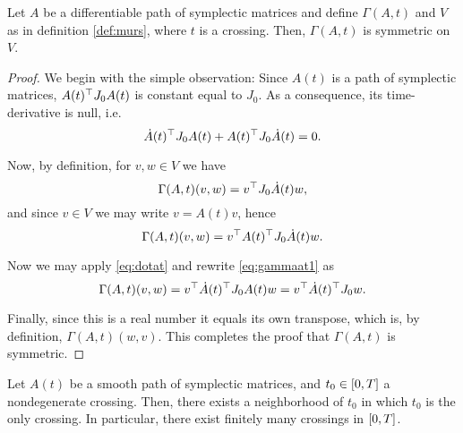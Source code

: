 \begin{lemma}\label{lemma:rs1}
Let $A$ be a differentiable path of symplectic matrices and define $\Gamma(A,t)$ and $V$ as in definition \ref{def:murs}, where $t$ is a crossing. Then, $\Gamma(A,t)$ is symmetric on $V$.
\end{lemma}

\begin{proof}
We begin with the simple observation: Since $A(t)$ is a path of symplectic matrices, $A(t)^\top J_0 A(t)$ is constant equal to $J_0$. As a consequence, its time-derivative is null, i.e.
\begin{equation}\label{eq:dotat}
\dot A(t)^\top J_0 A(t) + A(t)^\top J_0 \dot A(t) = 0.
\end{equation}

Now, by definition, for $v,w \in V$ we have
\begin{equation}
\Gamma(A,t)(v,w) = v^\top J_0 \dot A(t) w,
\end{equation}
and since $v \in V$ we may write $v = A(t) v$, hence
\begin{equation}\label{eq:gammaat1}
\Gamma(A,t)(v,w) = v^\top A(t)^\top J_0 \dot A(t) w.
\end{equation}

Now we may apply \eqref{eq:dotat} and rewrite \eqref{eq:gammaat1} as
\begin{equation}
\Gamma(A,t)(v,w) = v^\top \dot A(t)^\top J_0 A(t) w = v^\top \dot A(t)^\top J_0 w.
\end{equation}

Finally, since this is a real number it equals its own transpose, which is, by definition, $\Gamma(A,t)(w,v)$. This completes the proof that $\Gamma(A,t)$ is symmetric.
\end{proof}

\begin{lemma}\label{lemma:ndcrossisolated}
Let $A(t)$ be a smooth path of symplectic matrices, and $t_0 \in \interval0T$ a nondegenerate crossing. Then, there exists a neighborhood of $t_0$ in which $t_0$ is the only crossing. In particular, there exist finitely many crossings in $\interval0T$.
\end{lemma}

